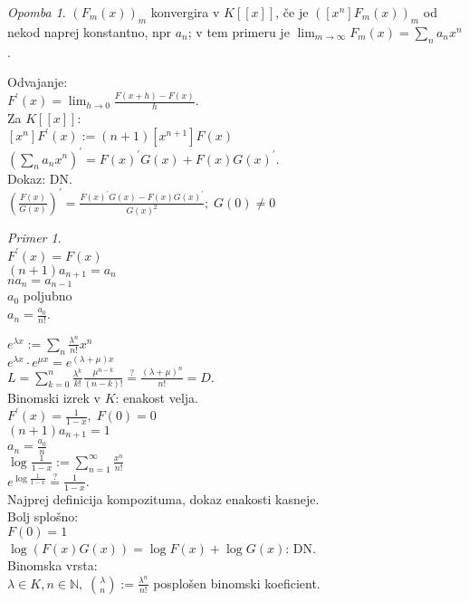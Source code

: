 \documentclass[a4paper, 12pt]{book}
\theoremstyle{definition}
\theoremstyle{remark}
\newtheorem*{ex}{Primer}
\newtheorem*{rem}{Opomba}
\newcommand{\N}{\mathbb{N}}
\begin{document}
\begin{rem}
  $(F_m(x))_m$ konvergira v $K[[x]]$, če je $([x^n] F_m(x))_m$ od nekod naprej konstantno, npr $a_n$;
  v tem primeru je $\lim_{m \to \infty} F_m(x) = \sum_n a_n x^n$.
\end{rem}



Odvajanje: \\
$F^{'}(x) = \lim_{h \to 0} \frac{F(x+h) - F(x)}{h}$. \\
Za $K[[x]]:$ \\
$[x^n] F^{'}(x) := (n+1) [x^{n+1}] F(x)$ \\
$(\sum_n a_n x^n)^{'} = F(x)^{'} G(x) + F(x) G(x)^{'}$. \\
Dokaz: DN. \\
$\left(\frac{F(x)}{G(x)}\right)^{'} = \frac{F(x)^{'} G(x) - F(x) G(x)^{'}}{G(x)^2}; \; G(0) \neq 0$
\begin{ex} \text{} \\
  $F^{'}(x) = F(x)$ \\
  $(n+1) a_{n+1} = a_n$ \\
  $n a_n = a_{n-1}$ \\
  $a_0$ poljubno \\
  $a_n = \frac{a_0}{n!}$.
\end{ex}
$e^{\lambda x} := \sum_n \frac{\lambda^n}{n!} x^n$ \\
$e^{\lambda x} \cdot e^{\mu x} = e^{(\lambda + \mu) x}$ \\
$L = \sum_{k=0}^{n} \frac{\lambda^k}{k!} \frac{\mu^{n-k}}{(n-k)!} \stackrel{?}{=} \frac{(\lambda+\mu)^n}{n!} = D$. \\
Binomski izrek v $K$: enakost velja. \\
$F^{'}(x) = \frac{1}{1-x}, \; F(0) = 0$ \\
$(n+1) a_{n+1} = 1$ \\
$a_n = \frac{a_0}{n}$ \\
$\log \frac{1}{1-x} := \sum_{n=1}^{\infty} \frac{x^n}{n!}$ \\
$e^{\log \frac{1}{1-x}} \stackrel{?}{=} \frac{1}{1-x}$. \\
Najprej definicija kompozituma, dokaz enakosti kasneje. \\
Bolj splošno: \\
$F(0) = 1$ \\
$\log (F(x) G(x)) = \log F(x) + \log G(x)$: DN. \\
Binomska vrsta: \\
$\lambda \in K, n \in \N, \; \binom{\lambda}{n} := \frac{\lambda^{\underline{n}}}{n!}$ posplošen binomski koeficient. \\
\end{document}
